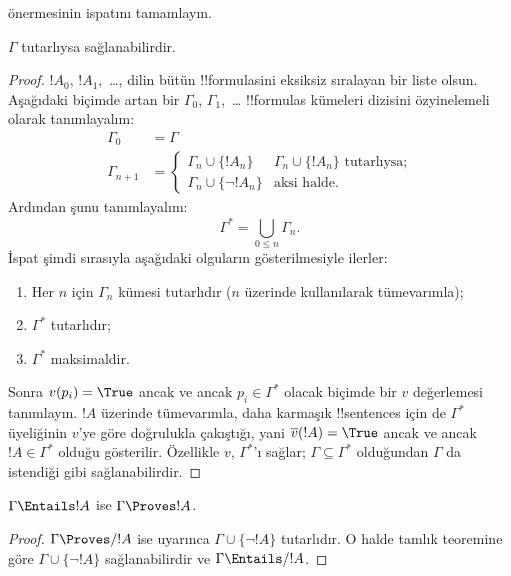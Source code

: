 \documentclass[../../../include/open-logic-section]{subfiles}
\begin{document}
\begin{prob}
   önermesinin ispatını tamamlayın.
\end{prob}

\begin{thm}[Tamlık]
$\Gamma$ tutarlıysa sağlanabilirdir.
\end{thm}

\begin{proof}
$!A_0$, $!A_1$,~\dots, dilin bütün !!{formula}s{}ini eksiksiz sıralayan bir
liste olsun. Aşağıdaki biçimde artan bir $\Gamma_0$, $\Gamma_1$,~\dots
!!{formula}s kümeleri dizisini özyinelemeli olarak tanımlayalım:
\begin{align*}
\Gamma_0 & = \Gamma\\
\Gamma_{n+1} &  =
\begin{cases}
  \Gamma_n \cup \{!A_n\} & \text{$\Gamma_n \cup \{!A_n\}$ tutarlıysa;}\\
  \Gamma_n \cup \{\lnot !A_n\} & \text{aksi halde}.
\end{cases}
\end{align*}
Ardından şunu tanımlayalım:
\[
\Gamma^* = \bigcup_{0\le n}\Gamma_n.
\]
İspat şimdi sırasıyla aşağıdaki olguların gösterilmesiyle ilerler:
\begin{enumerate}
\item Her $n$ için $\Gamma_n$ kümesi tutarlıdır ($n$ üzerinde
   kullanılarak tümevarımla);
\item $\Gamma^*$ tutarlıdır;
\item $\Gamma^*$ maksimaldir.
\end{enumerate}
Sonra $v(p_i) = \True$ ancak ve ancak $p_i \in \Gamma^*$ olacak biçimde bir
$v$ değerlemesi tanımlayın. $!A$ üzerinde tümevarımla, daha karmaşık
!!{sentence}s için de $\Gamma^*$ üyeliğinin $v$'ye göre doğrulukla çakıştığı,
yani $\overline{v}(!A) = \True$ ancak ve ancak $!A \in \Gamma^*$ olduğu
gösterilir. Özellikle $v$, $\Gamma^*$'ı sağlar; $\Gamma \subseteq \Gamma^*$
olduğundan $\Gamma$ da istendiği gibi sağlanabilirdir.
\end{proof}

\begin{cor}
$\Gamma \Entails !A$ ise $\Gamma \Proves !A$.
\end{cor}

\begin{proof}
$\Gamma\Proves/ !A$ ise  uyarınca
$\Gamma \cup \{\lnot !A\}$ tutarlıdır. O halde tamlık teoremine göre
$\Gamma \cup \{\lnot !A\}$ sağlanabilirdir ve $\Gamma \Entails/ !A$.
\end{proof}
\end{document}
